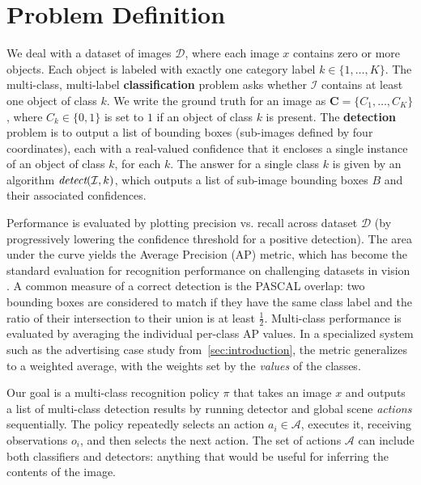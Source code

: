 \section{Problem Definition}\label{sec:det_problem}



We deal with a dataset of images $\mathcal{D}$, where each image $x$ contains zero or more objects.
Each object is labeled with exactly one category label $k \in \{1, \dots, K\}$.
The multi-class, multi-label \textbf{classification} problem asks whether $\mathcal{I}$ contains at least one object of class $k$.
We write the ground truth for an image as $\mathbf{C}=\{C_1, \dots, C_K\}$, where $C_k \in \{0, 1\}$ is set to $1$ if an object of class $k$ is present.
The \textbf{detection} problem is to output a list of bounding boxes (sub-images defined by four coordinates), each with a real-valued confidence that it encloses a single instance of an object of class $k$, for each $k$.
The answer for a single class $k$ is given by an algorithm $\emph{detect}(\mathcal{I},k)$, which outputs a list of sub-image bounding boxes $B$ and their associated confidences.

Performance is evaluated by plotting precision vs. recall across dataset $\mathcal{D}$ (by progressively lowering the confidence threshold for a positive detection).
The area under the curve yields the Average Precision (AP) metric, which has become the standard evaluation for recognition performance on challenging datasets in vision \cite{pascal-voc-2010}.
A common measure of a correct detection is the PASCAL overlap: two bounding boxes are considered to match if they have the same class label and the ratio of their intersection to their union is at least $\frac{1}{2}$.
Multi-class performance is evaluated by averaging the individual per-class AP values.
In a specialized system such as the advertising case study from~\autoref{sec:introduction}, the metric generalizes to a weighted average, with the weights set by the \emph{values} of the classes.

Our goal is a multi-class recognition policy $\pi$ that takes an image $x$ and outputs a list of multi-class detection results by running detector and global scene \emph{actions} sequentially.
The policy repeatedly selects an action $a_i \in \mathcal{A}$, executes it, receiving observations $o_i$, and then selects the next action.
The set of actions $\mathcal{A}$ can include both classifiers and detectors: anything that would be useful for inferring the contents of the image.

